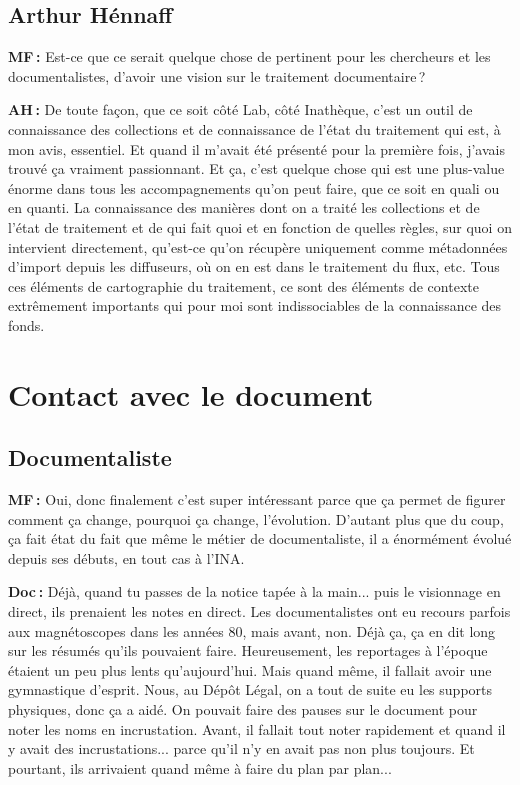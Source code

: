 \subsection*{Arthur Hénnaff  }

\textbf{MF :} Est-ce que ce serait quelque chose de pertinent pour les chercheurs et les documentalistes, d’avoir une vision sur le traitement documentaire ? 

\textbf{AH :} De toute façon, que ce soit côté Lab, côté Inathèque, c'est un outil de connaissance des collections et de connaissance de l'état du traitement qui est, à mon avis, essentiel.  Et quand il m'avait été présenté pour la première fois, j'avais trouvé ça vraiment passionnant. Et ça, c'est quelque chose qui est une plus-value énorme dans tous les accompagnements qu'on peut faire, que ce soit en quali ou en quanti. La connaissance des manières dont on a traité les collections et de l'état de traitement et de qui fait quoi et en fonction de quelles règles, sur quoi on intervient directement, qu'est-ce qu'on récupère uniquement comme métadonnées d'import depuis les diffuseurs, où on en est dans le traitement du flux, etc. Tous ces éléments de cartographie du traitement, ce sont des éléments de contexte extrêmement importants qui pour moi sont indissociables de la connaissance des fonds. 

\section*{Contact avec le document}

\subsection*{Documentaliste} 

\textbf{MF :} Oui, donc finalement c’est super intéressant parce que ça permet de figurer comment ça change, pourquoi ça change, l'évolution. D'autant plus que du coup, ça fait état du fait que même le métier de documentaliste, il a énormément évolué depuis ses débuts, en tout cas à l’INA. 

\textbf{Doc :} Déjà, quand tu passes de la notice tapée à la main... puis le visionnage en direct, ils prenaient les notes en direct. Les documentalistes ont eu recours parfois aux magnétoscopes dans les années 80, mais avant, non. Déjà ça, ça en dit long sur les résumés qu'ils pouvaient faire. Heureusement, les reportages à l'époque étaient un peu plus lents qu'aujourd'hui. Mais quand même, il fallait avoir une gymnastique d'esprit. Nous, au Dépôt Légal, on a tout de suite eu les supports physiques, donc ça a aidé. On pouvait faire des pauses sur le document pour noter les noms en incrustation. Avant, il fallait tout noter rapidement et quand il y avait des incrustations... parce qu'il n'y en avait pas non plus toujours. Et pourtant, ils arrivaient quand même à faire du plan par plan...

